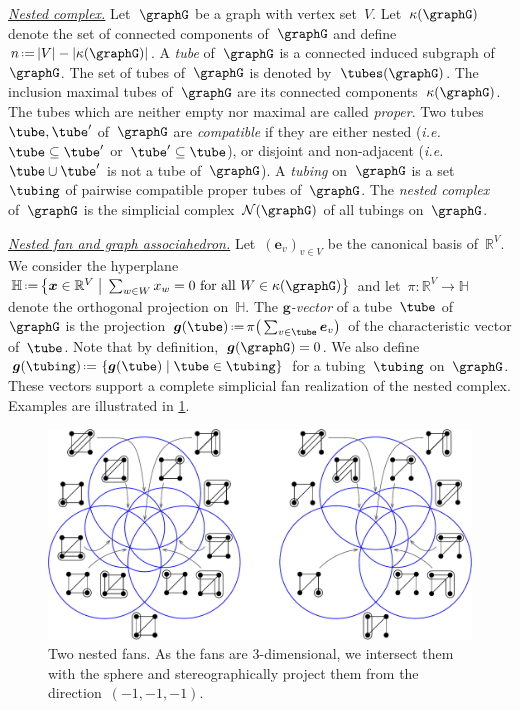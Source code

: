 \documentclass{amsart}
\theoremstyle{definition}
\newcommand{\R}{\mathbb{R}} %
\newcommand{\HH}{\mathbb{H}} %
\renewcommand{\b}[1]{{\boldsymbol{#1}}} %
\newcommand{\set}[2]{\left\{ #1 \;\middle|\; #2 \right\}} %
\newcommand{\bigset}[2]{\big\{ #1 \;\big|\; #2 \big\}} %
\newcommand{\eqdef}{\mbox{\,\raisebox{0.2ex}{\scriptsize\ensuremath{\mathrm:}}\ensuremath{=}\,}} %
\newcommand{\ie}{\textit{i.e.}~} %
\newcommand{\darkblue}{\color{darkblue}} %
\newcommand{\defn}[1]{\textsl{\darkblue #1}} %
\newcommand{\para}[1]{\medskip\noindent\uline{\textit{#1.}}} %
\newcommand{\gvector}[1]{\b{g}(#1)} %
\newcommand{\gvectors}[1]{\b{g}(#1)} %
\newcommand{\ground}{V} %
\newcommand{\connectedComponents}{\kappa} %
\newcommand{\nestedComplex}{\mathcal{N}} %
\begin{document}
\para{Nested complex}
%
Let~$\graphG$ be a graph with vertex set~$\ground$.
Let~$\connectedComponents(\graphG)$ denote the set of connected components of~$\graphG$ and define~$n \eqdef |\ground|-|\connectedComponents(\graphG)|$.
A \defn{tube} of~$\graphG$ is a connected induced subgraph of~$\graphG$.
The set of tubes of~$\graphG$ is denoted by~$\tubes(\graphG)$.
The inclusion maximal tubes of~$\graphG$ are its connected components~$\connectedComponents(\graphG)$.
The tubes which are neither empty nor maximal are called \defn{proper}.
Two tubes~$\tube, \tube'$ of~$\graphG$ are \defn{compatible} if they are either nested (\ie $\tube \subseteq \tube'$ or~$\tube' \subseteq \tube$), or disjoint and non-adjacent (\ie $\tube \cup \tube'$ is not a tube of~$\graphG$).
A \defn{tubing} on~$\graphG$ is a set~$\tubing$ of pairwise compatible proper tubes of~$\graphG$.
The \defn{nested complex} of~$\graphG$ is the simplicial complex~$\nestedComplex(\graphG)$ of all tubings on~$\graphG$.

\para{Nested fan and graph associahedron}
%
Let~$(\b{e}_v)_{v \in \ground}$ be the canonical basis of~$\R^\ground$.
We consider the hyperplane~${\HH \eqdef \bigset{\b{x} \in \R^\ground}{\sum_{w \in W} x_w = 0 \text{ for all } W \in \connectedComponents(\graphG)}}$ and let~$\pi : \R^\ground \to \HH$ denote the orthogonal projection on~$\HH$.
The \defn{$\b{g}$-vector} of a tube~$\tube$ of~$\graphG$ is the projection~$\gvector{\tube} \eqdef \pi \big( \sum_{v \in \tube} \b{e}_v \big)$ of the characteristic vector of~$\tube$.
Note that by definition,~$\gvector{\graphG} = 0$.
We also define~$\gvectors{\tubing} \eqdef \set{\gvector{\tube}}{\tube \in \tubing}$ for a tubing~$\tubing$ on~$\graphG$.
These vectors support a complete simplicial fan realization of the nested complex.
Examples are illustrated in \cref{fig:nestedFans}.

\begin{figure}[h]
	\capstart
	\centerline{\includegraphics[scale=.55]{nestedFans}}
	\caption{Two nested fans. As the fans are $3$-dimensional, we intersect them with the sphere and stereographically project them from the direction~$(-1,-1,-1)$.}
	\label{fig:nestedFans}
\end{figure}
\end{document}
